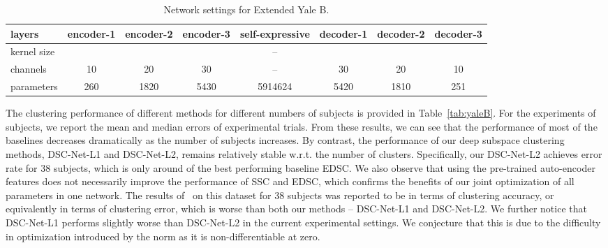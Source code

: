 \documentclass{article}
\begin{document}
\begin{table}[!t]
\centering
\footnotesize
\hspace*{-0.1cm}\begin{tabular}{ | l | c  c  c  c  c  c c | }
\hline
  layers      & encoder-1   & encoder-2  &  encoder-3 & self-expressive & decoder-1  & decoder-2   & decoder-3 \\            
  \hline
kernel size  &  &  &  & -- &   &    &   \\  
channels&  10         &  20         &   30        & -- & 30           &  20           & 10 \\
parameters& 260     & 1820   & 5430   & 5914624  & 5420  & 1810 & 251 \\
\hline
\end{tabular}
\caption{Network settings for Extended Yale B.}
\label{tab:struct-yaleb}
\vspace{-0.7cm}
\end{table}

The clustering performance of different methods for different numbers of subjects is provided in Table~\ref{tab:yaleB}. For the experiments of  subjects, we report the mean and median errors of  experimental trials. From these results, we can see that the performance of most of the baselines decreases dramatically as the number of subjects  increases. By contrast, the performance of our deep subspace clustering methods, DSC-Net-L1 and DSC-Net-L2, remains relatively stable w.r.t. the number of clusters. Specifically, our DSC-Net-L2 achieves  error rate for 38 subjects, which is only around  of the best performing baseline EDSC. We also observe that using the pre-trained auto-encoder features does not necessarily improve the performance of SSC and EDSC, which confirms the benefits of our joint optimization of all parameters in one network. The results of~\cite{peng2016deep} on this dataset for 38 subjects was reported to be  in terms of clustering accuracy, or equivalently  in terms of clustering error, which is worse than both our methods -- DSC-Net-L1 and DSC-Net-L2. We further notice that DSC-Net-L1 performs slightly worse than DSC-Net-L2 in the current experimental settings. We conjecture that this is due to the difficulty in optimization introduced by the  norm as it is non-differentiable at zero. 
\end{document}
